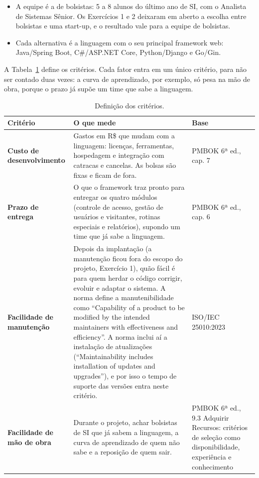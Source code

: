 \documentclass[a4paper]{article}
\begin{document}
\begin{itemize}
    \item A equipe é a de bolsistas: 5 a 8 alunos do último ano de SI, com o Analista de Sistemas Sênior. Os Exercícios 1 e 2 deixaram em aberto a escolha entre bolsistas e uma start-up, e o resultado vale para a equipe de bolsistas.
    \item Cada alternativa é a linguagem com o seu principal framework web: Java/Spring Boot, C\#/ASP.NET Core, Python/Django e Go/Gin.
\end{itemize}

A Tabela~\ref{tab:definicoes} define os critérios. Cada fator entra em um único critério, para não ser contado duas vezes: a curva de aprendizado, por exemplo, só pesa na mão de obra, porque o prazo já supõe um time que sabe a linguagem.

\begin{table}[H]
    \centering
    \small
    \renewcommand{\arraystretch}{1.3}
    \begin{tabular}{|>{\raggedright\arraybackslash}p{2.8cm}|>{\raggedright\arraybackslash}p{9.6cm}|>{\raggedright\arraybackslash}p{3.8cm}|}
        \hline
        \rowcolor{eapC}
        \textbf{Critério} & \textbf{O que mede} & \textbf{Base} \\
        \hline
        \textbf{Custo de desenvolvimento} & Gastos em R\$ que mudam com a linguagem: licenças, ferramentas, hospedagem e integração com catracas e cancelas. As bolsas são fixas e ficam de fora. & PMBOK 6ª ed., cap. 7 \cite{pmi2017} \\
        \hline
        \textbf{Prazo de entrega} & O que o framework traz pronto para entregar os quatro módulos (controle de acesso, gestão de usuários e visitantes, rotinas especiais e relatórios), supondo um time que já sabe a linguagem. & PMBOK 6ª ed., cap. 6 \cite{pmi2017} \\
        \hline
        \textbf{Facilidade de manutenção} & Depois da implantação (a manutenção ficou fora do escopo do projeto, Exercício 1), quão fácil é para quem herdar o código corrigir, evoluir e adaptar o sistema. A norma define a manutenibilidade como \enquote{Capability of a product to be modified by the intended maintainers with effectiveness and efficiency}. A norma inclui aí a instalação de atualizações (\enquote{Maintainability includes installation of updates and upgrades}), e por isso o tempo de suporte das versões entra neste critério. & ISO/IEC 25010:2023 \cite{arc42iso} \\
        \hline
        \textbf{Facilidade de mão de obra} & Durante o projeto, achar bolsistas de SI que já sabem a linguagem, a curva de aprendizado de quem não sabe e a reposição de quem sair. & PMBOK 6ª ed., 9.3 Adquirir Recursos: critérios de seleção como disponibilidade, experiência e conhecimento \cite{pmi2017} \\
        \hline
    \end{tabular}
    \caption{Definição dos critérios.}
    \label{tab:definicoes}
\end{table}
\end{document}
